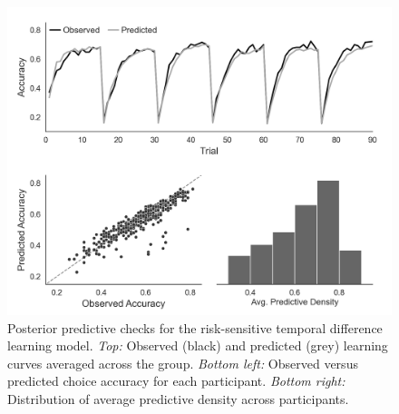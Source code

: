 \documentclass[a4paper,notitlepage,12pt]{article}
\begin{document}
\begin{figure}[!h]
\includegraphics[width=16cm]{../figures/supp_01.png}
\centering
\captionsetup{width=0.88\textwidth}
\caption{Posterior predictive checks for the risk-sensitive temporal difference learning model. \textit{Top:} Observed (black) and predicted (grey) learning curves averaged across the group. \textit{Bottom left:} Observed versus predicted choice accuracy for each participant. \textit{Bottom right:} Distribution of average predictive density across participants.}
\label{fig:posterior_check}
\end{figure}

\end{document}
